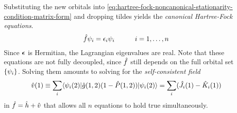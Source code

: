 \documentclass[11pt]{article}
\numberwithin{equation}{section}
\begin{document}
Substituting the new orbitals into \cref{eq:hartree-fock-noncanonical-stationarity-condition-matrix-form} and dropping tildes yields the \textit{canonical Hartree-Fock equations}.
\begin{align*}
  \hat{f}\psi _i
=
  \epsilon _i\psi _i
\hspace{30pt}
  i=1,\ldots,n
\end{align*}
Since $\bm{\ev}$ is Hermitian, the Lagrangian eigenvalues are real.
Note that these equations are not fully decoupled, since $\hat{f}$ still depends on the full orbital set $\{\psi _i\}$.
Solving them amounts to solving for the {\it self-consistent field} 
\begin{align}
  \hat{v}(1)
\equiv
\sum_i
  \langle\psi _i(2)|\hat{g}(1,2)(1-\hat{P}(1,2))|\psi _i(2)\rangle
=
\sum_i
  (\hat{J}_i(1)-\hat{K}_i(1))
\end{align}
in $\hat{f}=\hat{h}+\hat{v}$ that allows all $n$ equations to hold true simultaneously.


\newpage
\appendix
\end{document}
